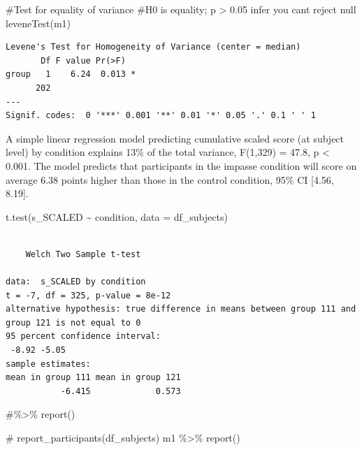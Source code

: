 \documentclass[
  letterpaper,
  DIV=11,
  numbers=noendperiod]{scrreprt}
\newenvironment{Shaded}{\begin{snugshade}}{\end{snugshade}}
\newcommand{\AttributeTok}[1]{\textcolor[rgb]{0.40,0.45,0.13}{#1}}
\newcommand{\CommentTok}[1]{\textcolor[rgb]{0.37,0.37,0.37}{#1}}
\newcommand{\FunctionTok}[1]{\textcolor[rgb]{0.28,0.35,0.67}{#1}}
\newcommand{\NormalTok}[1]{\textcolor[rgb]{0.00,0.23,0.31}{#1}}
\newcommand{\SpecialCharTok}[1]{\textcolor[rgb]{0.37,0.37,0.37}{#1}}
\begin{document}
\begin{Shaded}
\begin{Highlighting}[]
\CommentTok{\#Test for equality of variance}
\CommentTok{\#H0 is equality; p \textgreater{} 0.05 infer you can\textquotesingle{}t reject null}
\FunctionTok{leveneTest}\NormalTok{(m1)}
\end{Highlighting}
\end{Shaded}

\begin{verbatim}
Levene's Test for Homogeneity of Variance (center = median)
       Df F value Pr(>F)  
group   1    6.24  0.013 *
      202                 
---
Signif. codes:  0 '***' 0.001 '**' 0.01 '*' 0.05 '.' 0.1 ' ' 1
\end{verbatim}

A simple linear regression model predicting cumulative scaled score (at
subject level) by condition explains 13\% of the total variance,
F(1,329) = 47.8, p \textless{} 0.001. The model predicts that
participants in the impasse condition will score on average 6.38 points
higher than those in the control condition, 95\% CI {[}4.56, 8.19{]}.

\begin{Shaded}
\begin{Highlighting}[]
\FunctionTok{t.test}\NormalTok{(s\_SCALED }\SpecialCharTok{\textasciitilde{}}\NormalTok{ condition, }\AttributeTok{data =}\NormalTok{ df\_subjects)}
\end{Highlighting}
\end{Shaded}

\begin{verbatim}

    Welch Two Sample t-test

data:  s_SCALED by condition
t = -7, df = 325, p-value = 8e-12
alternative hypothesis: true difference in means between group 111 and group 121 is not equal to 0
95 percent confidence interval:
 -8.92 -5.05
sample estimates:
mean in group 111 mean in group 121 
           -6.415             0.573 
\end{verbatim}

\begin{Shaded}
\begin{Highlighting}[]
\CommentTok{\#\%\textgreater{}\% report()}
\end{Highlighting}
\end{Shaded}

\begin{Shaded}
\begin{Highlighting}[]
\CommentTok{\# report\_participants(df\_subjects)}
\NormalTok{m1 }\SpecialCharTok{\%\textgreater{}\%} \FunctionTok{report}\NormalTok{()}
\end{Highlighting}
\end{Shaded}
\end{document}

